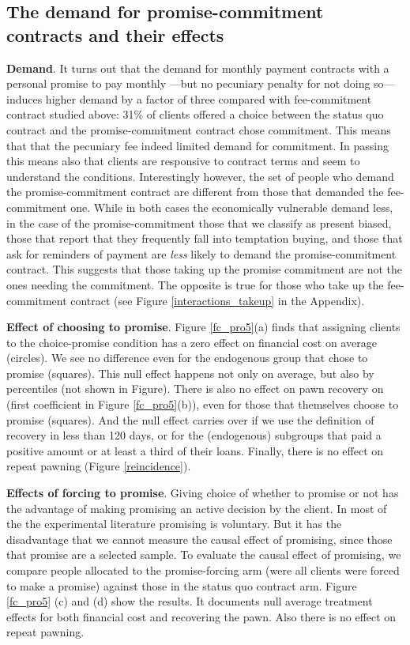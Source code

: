 \documentclass[11pt]{article}
\begin{document}
\subsection{The demand for promise-commitment contracts and their effects}

\vspace{.2in}
\noindent \textbf{Demand}. It turns out that the demand for monthly payment contracts with a personal promise to pay monthly ---but no pecuniary penalty for not doing so--- induces higher demand by a factor of three compared with fee-commitment contract studied above: 31\% of clients offered a choice between the status quo contract and the promise-commitment contract chose commitment. This means that that the pecuniary fee indeed limited demand for commitment. In passing this means also that clients are responsive to contract terms and seem to understand the conditions. Interestingly however, the set of people who demand the promise-commitment contract are different from those that demanded the fee-commitment one. While in both cases the economically vulnerable demand less, in the case of the promise-commitment those that we classify as present biased, those that report that they frequently fall into temptation buying, and those that ask for reminders of payment are \textit{less} likely to demand the promise-commitment contract.  This suggests that those taking up the promise commitment are not the ones needing the commitment. The opposite is true for those who take up the fee-commitment contract (see Figure \ref{interactions_takeup} in the Appendix). 

\vspace{.2in}
\noindent \textbf{Effect of choosing to promise}. Figure \ref{fc_pro5}(a) finds that assigning clients to the choice-promise condition has a zero effect on financial cost on average (circles). We see no difference even for the endogenous group that chose to promise (squares). This null effect happens not only on average, but also by percentiles (not shown in Figure). There is also no effect on pawn recovery on (first coefficient in Figure \ref{fc_pro5}(b)), even for those that themselves choose to promise (squares). And the null effect carries over if we use the definition of recovery in less than 120 days, or for the (endogenous) subgroups that paid a positive amount or at least a third of their loans. Finally, there is no effect on repeat pawning (Figure \ref{reincidence}). 

\vspace{.2in}
\noindent \textbf{Effects of forcing to promise}. Giving choice of whether to promise or not has the advantage of making promising an active decision by the client. In most of the the experimental literature promising is voluntary. But it has the disadvantage that we cannot measure the causal effect of promising, since those that promise are a selected sample. To evaluate the causal effect of promising, we compare people allocated to the promise-forcing arm (were all clients were forced to make a promise) against those in the status quo contract arm. Figure \ref{fc_pro5} (c) and (d) show the results. It documents null average treatment effects for both financial cost and recovering the pawn. Also there is no effect on repeat pawning.
\end{document}
